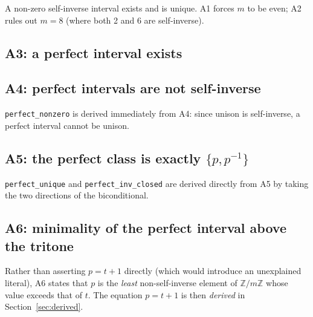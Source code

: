 \documentclass{amsart}
\begin{document}
A non-zero self-inverse interval exists and is unique.  A1 forces $m$ to
be even; A2 rules out $m = 8$ (where both 2 and 6 are self-inverse).



\subsection{A3: a perfect interval exists}



\subsection{A4: perfect intervals are not self-inverse}

\texttt{perfect\_nonzero} is derived immediately from A4: since unison is
self-inverse, a perfect interval cannot be unison.



\subsection{A5: the perfect class is exactly \texorpdfstring{$\{p, p^{-1}\}$}{the pair}}

\texttt{perfect\_unique} and \texttt{perfect\_inv\_closed} are derived
directly from A5 by taking the two directions of the biconditional.



\subsection{A6: minimality of the perfect interval above the tritone}

Rather than asserting $p = t + 1$ directly (which would introduce an
unexplained literal), A6 states that $p$ is the \emph{least}
non-self-inverse element of $\mathbb{Z}/m\mathbb{Z}$ whose value exceeds
that of $t$.  The equation $p = t + 1$ is then \emph{derived} in
Section~\ref{sec:derived}.
\end{document}
